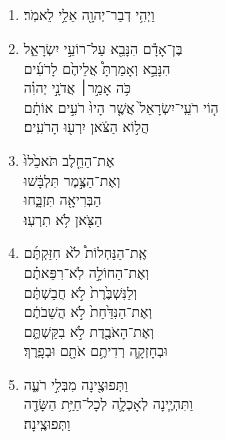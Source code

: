 \documentclass[12pt,a4paper,titlepage]{article}
\def \verseSpace{\vskip 0.45em}
\def \pscolor{red} %
\def \pslabelsep{0.3em} %
\def \psleftmargin{1em} %
\begin{document}
\begin{hebrew}

  \newpage

  \section*{}
  \subsection*{}
  \vspace{-0.62mm}
  \begin{enumerate}[leftmargin=\psleftmargin, labelsep=\pslabelsep, label=\fontspec{Linux Libertine}\arabic*, font=\color{\pscolor}\small\textsuperscript, parsep=0em, itemsep=0em, topsep=0em]
    \item וַיְהִ֥י דְבַר־יְהוָ֖ה אֵלַ֥י לֵאמֹֽר׃
    \item  בֶּן־אָדָ֕ם הִנָּבֵ֖א עַל־רוֹעֵ֣י יִשְׂרָאֵ֑ל \\ הִנָּבֵ֣א וְאָמַרְתָּ֩ אֲלֵיהֶ֙ם לָרֹעִ֜ים \\ כֹּ֥ה אָמַ֣ר׀ אֲדֹנָ֣י יְהוִ֗ה \\ ה֤וֹי רֹעֵֽי־יִשְׂרָאֵל֙ אֲשֶׁ֤ר הָיוּ֙ רֹעִ֣ים אוֹתָ֔ם \\ הֲל֣וֹא הַצֹּ֔אן יִרְע֖וּ הָרֹעִֽים׃
    \item אֶת־הַחֵ֤לֶב תֹּאכֵ֙לוּ֙ \\ וְאֶת־הַצֶּ֣מֶר תִּלְבָּ֔שׁוּ \\ הַבְּרִיאָ֖ה תִּזְבָּ֑חוּ \\ הַצֹּ֖אן לֹ֥א תִרְעֽוּ׃
    \item אֶֽת־הַנַּחְלוֹת֩ לֹ֙א חִזַּקְתֶּ֜ם \\ וְאֶת־הַחוֹלָ֣ה לֹֽא־רִפֵּאתֶ֗ם \\ וְלַנִּשְׁבֶּ֙רֶת֙ לֹ֣א חֲבַשְׁתֶּ֔ם \\ וְאֶת־הַנִּדַּ֙חַת֙ לֹ֣א הֲשֵׁבֹתֶ֔ם \\ וְאֶת־הָאֹבֶ֖דֶת לֹ֣א בִקַּשְׁתֶּ֑ם \\ וּבְחָזְקָ֛ה רְדִיתֶ֥ם אֹתָ֖ם וּבְפָֽרֶךְ׃
    \item וַתְּפוּצֶ֖ינָה מִבְּלִ֣י רֹעֶ֑ה \\ וַתִּהְיֶ֧ינָה לְאָכְלָ֛ה לְכָל־חַיַּ֥ת הַשָּׂדֶ֖ה \\ וַתְּפוּצֶֽינָה׃

\end{enumerate}
\end{hebrew}
\end{document}
